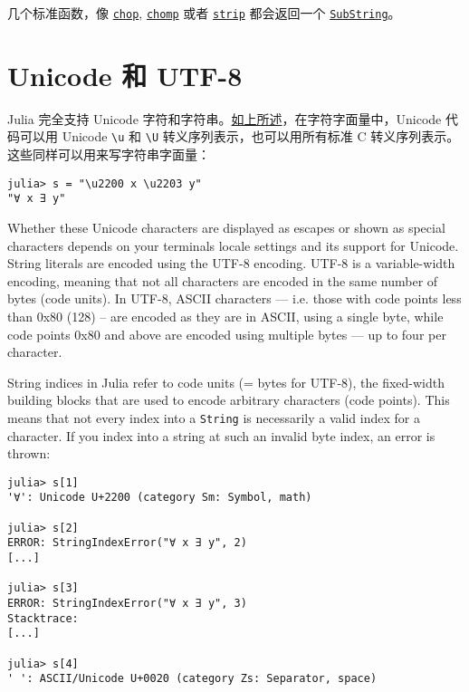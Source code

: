 几个标准函数，像 \hyperlink{18002354026785919806}{\texttt{chop}}, \hyperlink{5360081372937794006}{\texttt{chomp}} 或者 \hyperlink{7002432768371197450}{\texttt{strip}} 都会返回一个 \hyperlink{2624824381693370630}{\texttt{SubString}}。



\hypertarget{12357763399910926447}{}


\section{Unicode 和 UTF-8}



Julia 完全支持 Unicode 字符和字符串。\hyperlink{16744269384625214739}{如上所述}，在字符字面量中，Unicode 代码可以用 Unicode \texttt{{\textbackslash}u} 和 \texttt{{\textbackslash}U} 转义序列表示，也可以用所有标准 C 转义序列表示。这些同样可以用来写字符串字面量：




\begin{verbatim}
julia> s = "\u2200 x \u2203 y"
"∀ x ∃ y"
\end{verbatim}



Whether these Unicode characters are displayed as escapes or shown as special characters depends on your terminal{\textquotesingle}s locale settings and its support for Unicode. String literals are encoded using the UTF-8 encoding. UTF-8 is a variable-width encoding, meaning that not all characters are encoded in the same number of bytes ({\textquotedbl}code units{\textquotedbl}). In UTF-8, ASCII characters — i.e. those with code points less than 0x80 (128) – are encoded as they are in ASCII, using a single byte, while code points 0x80 and above are encoded using multiple bytes — up to four per character.



String indices in Julia refer to code units (= bytes for UTF-8), the fixed-width building blocks that are used to encode arbitrary characters (code points). This means that not every index into a \texttt{String} is necessarily a valid index for a character. If you index into a string at such an invalid byte index, an error is thrown:




\begin{verbatim}
julia> s[1]
'∀': Unicode U+2200 (category Sm: Symbol, math)

julia> s[2]
ERROR: StringIndexError("∀ x ∃ y", 2)
[...]

julia> s[3]
ERROR: StringIndexError("∀ x ∃ y", 3)
Stacktrace:
[...]

julia> s[4]
' ': ASCII/Unicode U+0020 (category Zs: Separator, space)
\end{verbatim}



